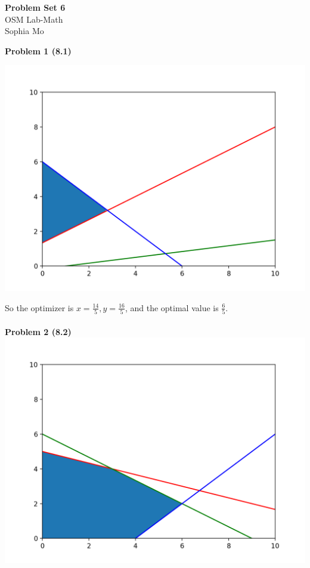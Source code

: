 \documentclass[letterpaper,12pt]{article}
\theoremstyle{definition}
\begin{document}
\begin{flushleft}
  \textbf{\large{Problem Set} 6} \\
  OSM Lab-Math \\
  Sophia Mo
\end{flushleft}

\vspace{5mm}

\noindent\textbf{Problem 1 (8.1)} \\
\begin{center}
\includegraphics[scale=0.4]{problem_1}
\end{center}
So the optimizer is $ x= \frac{14}{5}, y =\frac{16}{5}$, and the optimal value is $\frac{6}{5}$.\\
\\
\noindent\textbf{Problem 2 (8.2)} \\
\includegraphics[scale=0.4]{problem_2a}
\end{document}
